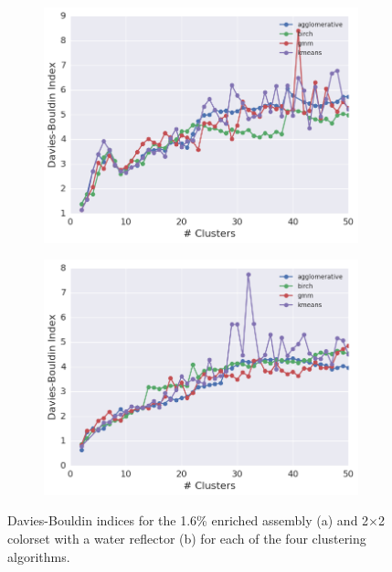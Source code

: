 \begin{figure}[h!]
\centering
\begin{subfigure}{\textwidth}
  \centering
  \includegraphics[width=0.9\linewidth]{figures/results/model-select/assm-16/db-combined-U238-capture-1}
  \caption{}
  \label{fig:chap11-assm-16-db-index}
\end{subfigure}
\begin{subfigure}{\textwidth}
  \centering
  \includegraphics[width=0.9\linewidth]{figures/results/model-select/reflector/db-combined-U238-nu-fission-1}
  \caption{}
\label{fig:chap11-refl-db-index}
\end{subfigure}
\caption[Davies-Bouldin index variation with the number of clusters]{Davies-Bouldin indices for the 1.6\% enriched assembly (a) and 2$\times$2 colorset with a water reflector (b) for each of the four clustering algorithms.}
\label{fig:chap11-db-indices}
\end{figure}

